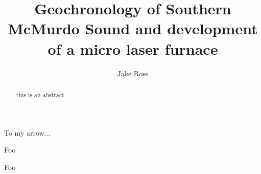 \documentclass[12pt]{report}
\author{Jake Ross}
\title{Geochronology of Southern McMurdo Sound and development of a micro laser furnace}
\begin{document}
%
%
\begin{dedication}
{To my arrow...}
\end{dedication}
%
%
\titlepage
%
%
\begin{abstract}
this is an abstract

\end{abstract}
\begin{acknowledgments}
{Foo}

\end{acknowledgments}
\tableofcontents
%
%
\listoftables
\listoffigures
\signaturepage
\begin{preface}
{Foo}
\end{preface}
\end{document}
